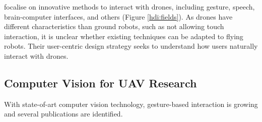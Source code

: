  \cite{cauchard_e_zhai_landay_2015} \hspace*{0.3cm} \textit{}
\hspace*{0.5cm}	focalise on innovative methods to interact with drones, including gesture, speech, brain-computer interfaces, and others (Figure \ref{hdi:fields}). As drones have different characteristics than ground robots, such as not allowing touch interaction, it is unclear whether existing techniques can be adapted to flying robots. Their user-centric design strategy seeks to understand how users naturally interact with drones. 


\subsection{Computer Vision for UAV Research}


With state-of-art computer vision technology, gesture-based interaction is growing and several publications are identified. 

